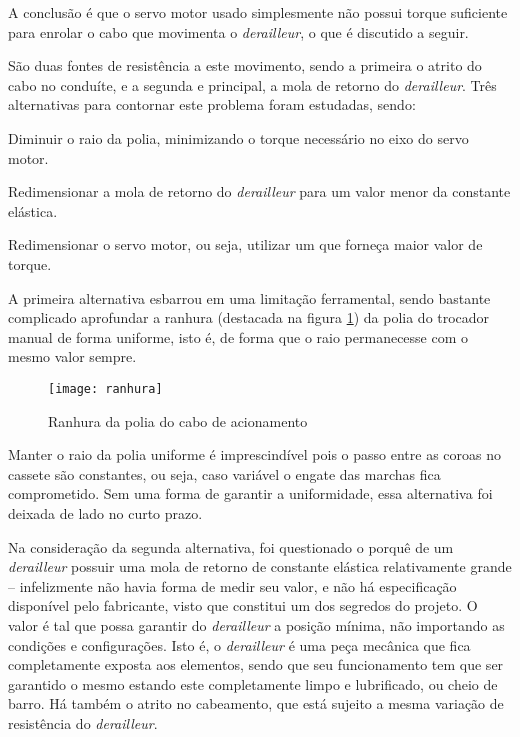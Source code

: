 \documentclass[a4paper,11pt]{article}
\begin{document}
A conclusão é que o servo motor usado simplesmente não possui torque suficiente
para enrolar o cabo que movimenta o \textit{derailleur}, o que é discutido a
seguir.

São duas fontes de resistência a este movimento, sendo a primeira o atrito do
cabo no conduíte, e a segunda e principal, a mola de retorno do
\textit{derailleur}. Três alternativas para contornar este problema foram
estudadas, sendo:
\begin{enumerate*}
  \item Diminuir o raio da polia, minimizando o torque necessário no eixo do
servo motor.
  \item Redimensionar a mola de retorno do \textit{derailleur} para um valor
menor da constante elástica.
  \item Redimensionar o servo motor, ou seja, utilizar um que forneça maior
valor de torque.
\end{enumerate*}

A primeira alternativa esbarrou em uma limitação ferramental, sendo bastante
complicado aprofundar a ranhura (destacada na figura \ref{fig:ranhura}) da polia
do trocador manual de forma uniforme, isto é, de forma que o raio permanecesse
com o mesmo valor sempre.
\begin{figure}[!h]
\begin{center}
  \texttt{[image: ranhura]}
\end{center}
  \caption{Ranhura da polia do cabo de acionamento}
  \label{fig:ranhura}
\end{figure}

Manter o raio da polia uniforme é imprescindível pois o passo entre as coroas
no cassete são constantes, ou seja, caso variável o engate das marchas fica
comprometido. Sem uma forma de garantir a uniformidade, essa alternativa foi
deixada de lado no curto prazo.

Na consideração da segunda alternativa, foi questionado o porquê de um
\textit{derailleur} possuir uma mola de retorno de constante elástica
relativamente grande -- infelizmente não havia forma de medir seu valor, e não
há especificação disponível pelo fabricante, visto que constitui um dos
segredos do projeto. O valor é tal que possa garantir do \textit{derailleur} a
posição mínima, não importando as condições e configurações. Isto é, o
\textit{derailleur} é uma peça mecânica que fica completamente exposta aos
elementos, sendo que seu funcionamento tem que ser garantido o mesmo estando
este completamente limpo e lubrificado, ou cheio de barro. Há também o atrito no
cabeamento, que está sujeito a mesma variação de resistência do
\textit{derailleur}.
\end{document}
